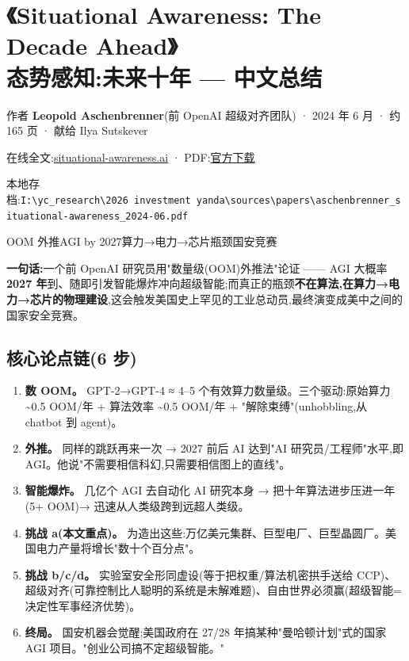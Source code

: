 \section{\texorpdfstring{《Situational Awareness: The Decade Ahead》\\
态势感知:未来十年 --- 中文总结}{《Situational Awareness: The Decade Ahead》 态势感知:未来十年 --- 中文总结}}\label{situational-awareness-the-decade-ahead-ux6001ux52bfux611fux77e5ux672aux6765ux5341ux5e74-ux4e2dux6587ux603bux7ed3}

作者 \textbf{Leopold Aschenbrenner}(前 OpenAI 超级对齐团队) · 2024 年 6 月 · 约 165 页 · 献给 Ilya Sutskever

在线全文:\href{https://situational-awareness.ai/}{situational-awareness.ai} · PDF:\href{https://situational-awareness.ai/wp-content/uploads/2024/06/situationalawareness.pdf}{官方下载}

本地存档:\texttt{I:\textbackslash{}yc\_research\textbackslash{}2026\ investment\ yanda\textbackslash{}sources\textbackslash{}papers\textbackslash{}aschenbrenner\_situational-awareness\_2024-06.pdf}

OOM 外推AGI by 2027算力→电力→芯片瓶颈国安竞赛

\textbf{一句话:}一个前 OpenAI 研究员用"数量级(OOM)外推法"论证 ------ AGI 大概率 \textbf{2027 年}到、随即引发智能爆炸冲向超级智能;而真正的瓶颈\textbf{不在算法,在算力→电力→芯片的物理建设},这会触发美国史上罕见的工业总动员,最终演变成美中之间的国家安全竞赛。

\subsection{核心论点链(6 步)}\label{ux6838ux5fc3ux8bbaux70b9ux94fe6-ux6b65}

\begin{enumerate}
\tightlist
\item
  \textbf{数 OOM。} GPT-2→GPT-4 ≈ 4--5 个有效算力数量级。三个驱动:原始算力 \textasciitilde0.5 OOM/年 + 算法效率 \textasciitilde0.5 OOM/年 + "解除束缚"(unhobbling,从 chatbot 到 agent)。
\item
  \textbf{外推。} 同样的跳跃再来一次 → 2027 前后 AI 达到"AI 研究员/工程师"水平,即 AGI。他说"不需要相信科幻,只需要相信图上的直线"。
\item
  \textbf{智能爆炸。} 几亿个 AGI 去自动化 AI 研究本身 → 把十年算法进步压进一年(5+ OOM)→ 迅速从人类级跨到远超人类级。
\item
  \textbf{挑战 a(本文重点)。} 为造出这些:万亿美元集群、巨型电厂、巨型晶圆厂。美国电力产量将增长"数十个百分点"。
\item
  \textbf{挑战 b/c/d。} 实验室安全形同虚设(等于把权重/算法机密拱手送给 CCP)、超级对齐(可靠控制比人聪明的系统是未解难题)、自由世界必须赢(超级智能=决定性军事经济优势)。
\item
  \textbf{终局。} 国安机器会觉醒;美国政府在 27/28 年搞某种"曼哈顿计划"式的国家 AGI 项目。"创业公司搞不定超级智能。"
\end{enumerate}

